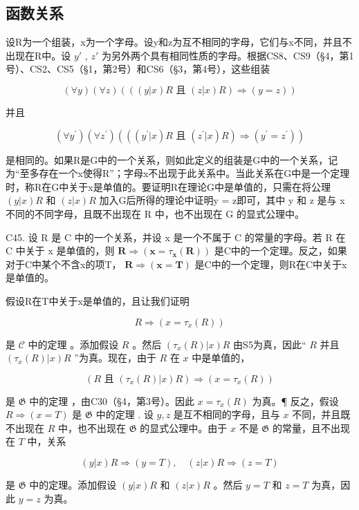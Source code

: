 \subsection{函数关系}

设R为一个组装，x为一个字母。设y和z为互不相同的字母，它们与x不同，并且不出现在R中。设 \(y'\) , \(z'\) 为另外两个具有相同性质的字母。根据CS8、CS9（§4，第1号）、CS2、CS5（§1，第2号）和CS6（§3，第4号），这些组装

\[
(\forall y) (\forall z) (((y | x) R \text { 且 } (z | x) R) \Longrightarrow (y = z))
\]

并且

\[
(\forall y ^ {\prime}) (\forall z ^ {\prime}) (((y ^ {\prime} | x) R \text { 且 } (z ^ {\prime} | x) R) \Longrightarrow (y ^ {\prime} = z ^ {\prime}))
\]

是相同的。如果R是G中的一个关系，则如此定义的组装是G中的一个关系，记为“至多存在一个x使得R”；字母x不出现于此关系中。当此关系在G中是一个定理时，称R在G中关于x是单值的。要证明R在理论G中是单值的，只需在将公理 \((y|x)R\) 和 \((z|x)R\) 加入G后所得的理论中证明y = z即可，其中 y 和 z 是与 x 不同的不同字母，且既不出现在 R 中，也不出现在 G 的显式公理中。

C45. 设 R 是 C 中的一个关系，并设 x 是一个不属于 C 的常量的字母。若 R 在 C 中关于 x 是单值的，则 \(\mathbf{R} \Longrightarrow (\mathbf{x} = \tau_{\mathbf{x}}(\mathbf{R}))\) 是C中的一个定理。反之，如果对于C中某个不含x的项T， \(\mathbf{R} \Longrightarrow (\mathbf{x} = \mathbf{T})\) 是C中的一个定理，则R在C中关于x是单值的。

假设R在T中关于x是单值的，且让我们证明

\[
R \Longrightarrow (x = \tau_ {x} (R))
\]

是 \(\mathcal{C}\) 中的定理 。添加假设 \(R\) 。然后 \((\tau_{x}(R)|x)R\) 由S5为真，因此“ \(R\) 并且 \((\tau_{x}(R)|x)R\) ”为真。现在，由于 \(R\) 在 \(x\) 中是单值的，

\[
(R \text {   且   } (\tau_ {x} (R) | x) R) \Longrightarrow (x = \tau_ {x} (R))
\]

是 \(\mathfrak{G}\) 中的定理 ，由C30（§4，第3号）。因此 \(x = \tau_x(R)\) 为真。¶ 反之，假设 \(R \Rightarrow (x = T)\) 是 \(\mathfrak{G}\) 中的定理 . 设 \(y, z\) 是互不相同的字母，且与 \(x\) 不同，并且既不出现在 \(R\) 中，也不出现在 \(\mathfrak{G}\) 的显式公理中。由于 \(x\) 不是 \(\mathfrak{G}\) 的常量，且不出现在 \(T\) 中，关系

\[
(y | x) R \Longrightarrow (y = T), \quad (z | x) R \Longrightarrow (z = T)
\]

是 \(\mathfrak{G}\) 中的定理。添加假设 \((y|x)R\) 和 \((z|x)R\) 。然后 \(y = T\) 和 \(z = T\) 为真，因此 \(y = z\) 为真。

